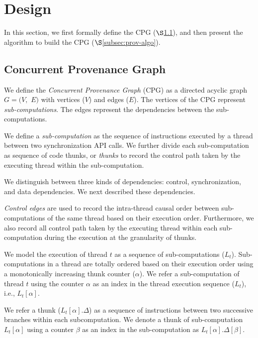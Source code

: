 \section{Design}
\label{sec:algorithms}
In this section, we first formally define the CPG ($\S$\ref{subsec:cpg}), and then present the algorithm to build the CPG ($\S$\ref{subsec:prov-algo}).

\subsection{Concurrent Provenance Graph} 
\label{subsec:cpg}

 We define the {\em
Concurrent Provenance Graph} (CPG)  as a directed acyclic graph $G =
(V,$ $E)$ with vertices ($V$) and edges ($E$). The
vertices of the CPG represent {\em sub-computations}. The edges represent the dependencies between the sub-computations. 


 We define a {\em sub-computation}  as the sequence of instructions
executed by a thread between two \pthreads synchronization API calls. We further divide each sub-computation as sequence of code thunks, or {\em thunks} to record the control path taken by the executing thread within the sub-computation.


 We distinguish between three kinds of dependencies: control, synchronization, and data dependencies. We next described these dependencies.



 

 {\em Control edges}  are used to record the intra-thread causal order between sub-computations of the same thread
based on their execution order. Furthermore, we also record all control path taken by the executing thread within each sub-computation during the execution at the granularity of {thunks}.  

We model the execution of thread $t$ as a sequence of sub-computations ($L_t$).  Sub-computations in a thread are totally ordered based on their execution order using a monotonically increasing thunk counter ($\alpha$). We refer a sub-computation of thread $t$ using the counter $\alpha$ as an index in the thread execution sequence ($L_t$), i.e., $L_t[\alpha]$.  

We refer a thunk ($L_t[\alpha].\Delta$) as a sequence of instructions between two successive branches within each subcomputation. We denote a thunk of sub-computation $L_t[\alpha]$ using a counter $\beta$ as an index in the sub-computation as $L_t[\alpha].\Delta[\beta]$.  


